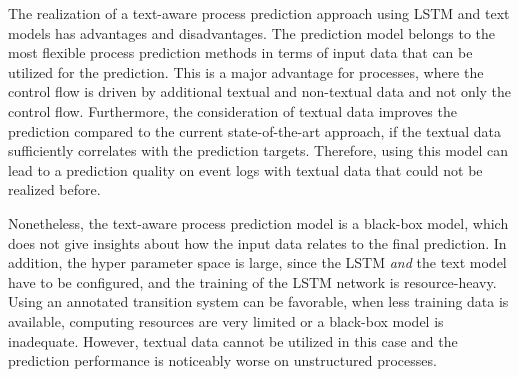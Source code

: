 The realization of a text-aware process prediction approach using LSTM and text models has advantages and disadvantages.
The prediction model belongs to the most flexible process prediction methods in terms of input data that can be utilized for the prediction.
This is a major advantage for processes, where the control flow is driven by additional textual and non-textual data and not only the control flow.
Furthermore, the consideration of textual data improves the prediction compared to the current state-of-the-art approach, if the textual data sufficiently correlates with the prediction targets.
Therefore, using this model can lead to a prediction quality on event logs with textual data that could not be realized before.

Nonetheless, the text-aware process prediction model is a black-box model, which does not give insights about how the input data relates to the final prediction.
In addition, the hyper parameter space is large, since the LSTM \textit{and} the text model have to be configured, and the training of the LSTM network is resource-heavy.
Using an annotated transition system can be favorable, when less training data is available, computing resources are very limited or a black-box model is inadequate.
However, textual data cannot be utilized in this case and the prediction performance is noticeably worse on unstructured processes.
